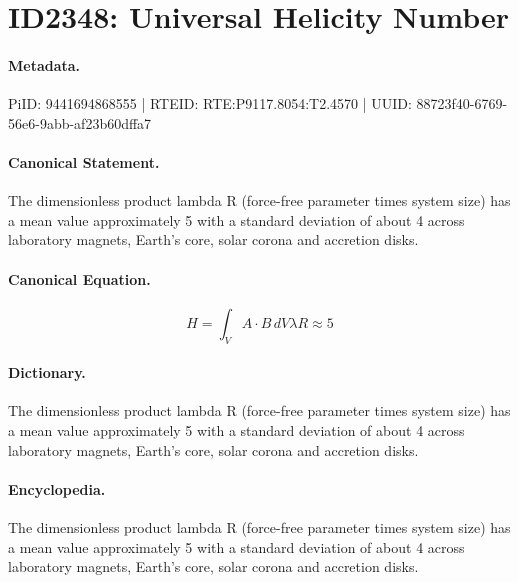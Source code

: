 \section*{ID2348: Universal Helicity Number}
\paragraph{Metadata.}
PiID: 9441694868555 | RTEID: RTE:P9117.8054:T2.4570 | UUID: 88723f40-6769-56e6-9abb-af23b60dffa7

\paragraph{Canonical Statement.}
The dimensionless product lambda R (force-free parameter times system size) has a mean value approximately 5 with a standard deviation of about 4 across laboratory magnets, Earth's core, solar corona and accretion disks.

\paragraph{Canonical Equation.}
\[
H=\int_V A\cdot B\,dV \lambda R\approx 5
\]

\paragraph{Dictionary.}
The dimensionless product lambda R (force-free parameter times system size) has a mean value approximately 5 with a standard deviation of about 4 across laboratory magnets, Earth's core, solar corona and accretion disks.

\paragraph{Encyclopedia.}
The dimensionless product lambda R (force-free parameter times system size) has a mean value approximately 5 with a standard deviation of about 4 across laboratory magnets, Earth's core, solar corona and accretion disks.
